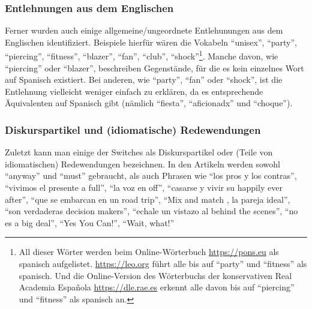 \subsubsection{Entlehnungen aus dem Englischen}
Ferner wurden auch einige allgemeine/ungeordnete Entlehunungen aus dem Englischen identifiziert.
Beispiele hierfür wären die Vokabeln ``unisex'', ``party'', ``piercing'', ``fitness'', ``blazer'', ``fan'', ``club'', ``shock''\footnote{All dieser Wörter werden beim Online-Wörterbuch \url{https://pons.eu} als spanisch aufgelistet. \url{https://leo.org} führt alle bis auf ``party'' und ``fitness'' als spanisch. Und die Online-Version des Wörterbuchs der konservativen Real Academia Española \url{https://dle.rae.es} erkennt alle davon bis auf ``piercing'' und ``fitness'' als spanisch an.}.
Manche davon, wie ``piercing'' oder ``blazer'', beschreiben Gegenstände, für die es kein einzelnes Wort auf Spanisch existiert.
Bei anderen, wie ``party'', ``fan'' oder ``shock'',  ist die Entlehnung vielleicht weniger einfach zu erklären, da es entsprechende Äquivalenten auf Spanisch gibt (nämlich ``fiesta'', ``aficionadx'' und ``choque''). %

\subsubsection{Diskurspartikel und (idiomatische) Redewendungen}
Zuletzt kann man einige der Switches als Diskurspartikel oder (Teile von idiomatischen) Redewendungen bezeichnen.
In den Artikeln werden sowohl ``anyway'' und ``must'' gebraucht, als auch Phrasen wie ``los pros y los contras'', ``vivimos el presente a full'', ``la voz en off'', ``casarse y vivir su happily ever after'', ``que se embarcan en un road trip'', ``Mix and match , la pareja ideal'', ``son verdaderas decision makers'', ``echale un vistazo al behind the scenes'', ``no es a big deal'', ``Yes You Can!'', ``Wait, what!''

